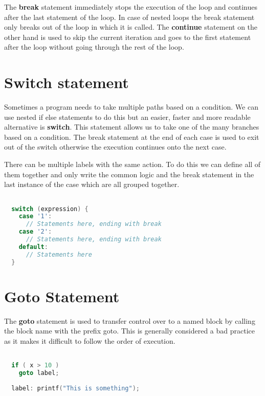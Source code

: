 \documentclass[11pt,a4paper,oneside]{book}
\begin{document}
\noindent The \textbf{break} statement immediately stops the execution of the loop and 
continues after the last statement of the loop. In case of nested loops the break 
statement only breaks out of the loop in which it is called. The \textbf{continue}
statement on the other hand is used to skip the current iteration and goes to the 
first statement after the loop without going through the rest of the loop.

\section{Switch statement}
\noindent Sometimes a program needs to take multiple paths based on a condition. We can
use nested if else statements to do this but an easier, faster and more readable 
alternative is \textbf{switch}. This statement allows us to take one of the many 
branches based on a condition. The break statement at the end of each case is used to 
exit out of the switch otherwise the execution continues onto the next case.

\noindent There can be multiple labels with the same action. To do this we can define
all of them together and only write the common logic and the break statement in the last
instance of the case which are all grouped together.

\begin{lstlisting}[language=C, title=Switch statement]

  switch (expression) {
    case '1':
      // Statements here, ending with break
    case '2':
      // Statements here, ending with break  
    default:
      // Statements here
  }

\end{lstlisting}

\section{Goto Statement}
\noindent The \textbf{goto} statement is used to transfer control over to a named block
by calling the block name with the prefix goto. This is generally considered a bad 
practice as it makes it difficult to follow the order of execution. 

\begin{lstlisting}[language=C, title=Goto statement]

  if ( x > 10 )
    goto label;
  
  label: printf("This is something");
  
\end{lstlisting}
\end{document}
